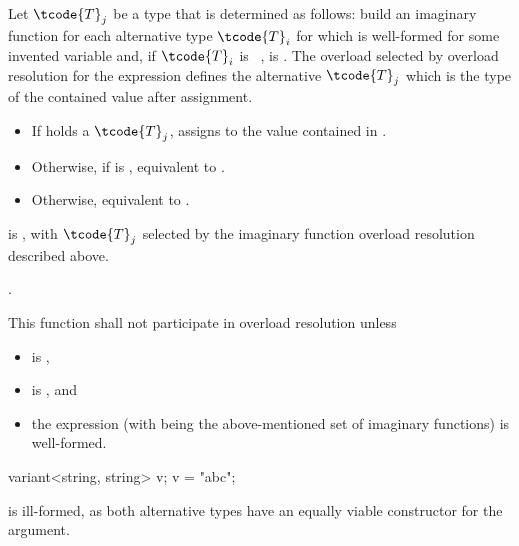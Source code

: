 \begin{itemdescr}
\pnum
Let $\tcode{T}_j$ be a type that is determined as follows:
build an imaginary function 
for each alternative type $\tcode{T}_i$
for which  
is well-formed for some invented variable  and,
if $\tcode{T}_i$ is \cv~,  is .
The overload  selected by overload
resolution for the expression  defines
the alternative $\tcode{T}_j$ which is the type of the contained value after
assignment.

\pnum
\effects
\begin{itemize}
\item
If  holds a $\tcode{T}_j$, assigns  to
the value contained in .
\item
Otherwise, if 
 is ,
equivalent to .
\item
Otherwise, equivalent to .
\end{itemize}

\pnum
\ensures
{} is , with $\tcode{T}_j$
selected by the imaginary function overload resolution described above.

\pnum
\returns
{}.

\pnum
\remarks
This function shall not participate in overload resolution unless
\begin{itemize}
\item
   is ,

\item
  is , and

\item
  the expression 
  (with  being the above-mentioned set
  of imaginary functions) is well-formed.
\end{itemize}

\pnum
\begin{note}
\begin{codeblock}
variant<string, string> v;
v = "abc";
\end{codeblock}
is ill-formed, as both alternative types have an equally viable constructor
for the argument.
\end{note}


\end{itemdescr}
